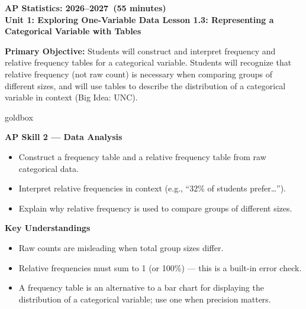 \documentclass[10pt]{article}
\begin{document}
\def\CourseName{AP Statistics}
\def\SchoolYear{2026--2027}
\def\MeetingLength{55 minutes}
\def\UnitNumberName{Unit 1: Exploring One-Variable Data \quad}
\def\LessonNumberName{Lesson 1.3: Representing a Categorical Variable with Tables}

\begin{center}
    {\Large\bfseries \CourseName: \SchoolYear\ (\MeetingLength) \\[4pt]
    {\small\bfseries \UnitNumberName \LessonNumberName}}
\end{center}

\begin{tcolorbox}[colback=sky,colframe=navy,boxrule=0.9pt,arc=2mm,
    left=2mm,right=2mm,top=1.5mm,bottom=1.5mm]
    \textbf{Primary Objective:} Students will construct and interpret frequency and
    relative frequency tables for a categorical variable. Students will recognize that
    relative frequency (not raw count) is necessary when comparing groups of different
    sizes, and will use tables to describe the distribution of a categorical variable
    in context (Big Idea: UNC).
\end{tcolorbox}

\vspace{4pt}

\begin{skillbox}{goldbox}
\begin{minipage}[t]{0.48\linewidth}
    \textbf{AP Skill 2 --- Data Analysis}
    \begin{itemize}
        \item Construct a frequency table and a relative frequency table from raw
              categorical data.
        \item Interpret relative frequencies in context
              (e.g., ``32\% of students prefer\ldots'').
        \item Explain why relative frequency is used to compare groups of different sizes.
    \end{itemize}
\end{minipage}
\hfill
\begin{minipage}[t]{0.48\linewidth}
    \textbf{Key Understandings}
    \begin{itemize}
        \item Raw counts are misleading when total group sizes differ.
        \item Relative frequencies must sum to 1 (or 100\%) --- this is a built-in
              error check.
        \item A frequency table is an alternative to a bar chart for displaying the
              distribution of a categorical variable; use one when precision matters.
    \end{itemize}
\end{minipage}
\end{skillbox}
\end{document}
